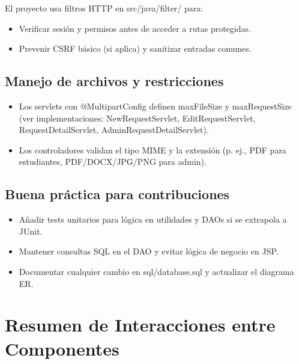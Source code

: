 \documentclass[12pt,letterpaper]{article}
\newcommand{\code}[1]{\texorpdfstring{\begingroup\normalfont\normalsize\def\_{\textunderscore\allowbreak}#1\endgroup}{#1}}
\begin{document}
El proyecto usa filtros HTTP en \code{src/java/filter/} para:
\begin{itemize}
    \item Verificar sesión y permisos antes de acceder a rutas protegidas.
    \item Prevenir CSRF básico (si aplica) y sanitizar entradas comunes.
\end{itemize}

\subsection{Manejo de archivos y restricciones}

\begin{itemize}
    \item Los servlets con \code{@MultipartConfig} definen \code{maxFileSize} y \code{maxRequestSize} (ver implementaciones: \code{NewRequestServlet}, \code{EditRequestServlet}, \code{RequestDetailServlet}, \code{AdminRequestDetailServlet}).
    \item Los controladores validan el tipo MIME y la extensión (p. ej., PDF para estudiantes, PDF/DOCX/JPG/PNG para admin).
\end{itemize}

\subsection{Buena práctica para contribuciones}

\begin{itemize}
    \item Añadir tests unitarios para lógica en utilidades y DAOs si se extrapola a JUnit.
    \item Mantener consultas SQL en el DAO y evitar lógica de negocio en JSP.
    \item Documentar cualquier cambio en \code{sql/database.sql} y actualizar el diagrama ER.
\end{itemize}

\section{Resumen de Interacciones entre Componentes}
\end{document}
